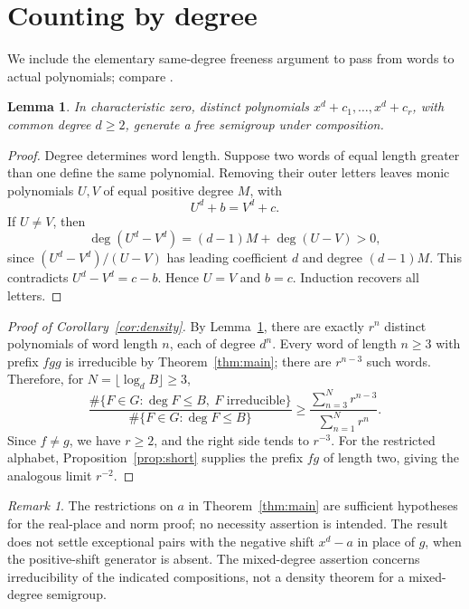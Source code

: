 \documentclass[11pt]{article}
\newtheorem{lemma}[theorem]{Lemma}
\theoremstyle{remark}
\newtheorem{remark}[theorem]{Remark}
\begin{document}
\section{Counting by degree}
We include the elementary same-degree freeness argument to pass from words to actual polynomials; compare \cite[Proposition~3.9]{BBHQS}.
\begin{lemma}\label{lem:free}
In characteristic zero, distinct polynomials $x^d+c_1,\ldots,x^d+c_r$, with common degree $d\geq2$, generate a free semigroup under composition.
\end{lemma}
\begin{proof}
Degree determines word length. Suppose two words of equal length greater than one define the same polynomial. Removing their outer letters leaves monic polynomials $U,V$ of equal positive degree $M$, with
\[
 U^d+b=V^d+c.
\]
If $U\ne V$, then
\[
 \deg(U^d-V^d)=(d-1)M+\deg(U-V)>0,
\]
since $(U^d-V^d)/(U-V)$ has leading coefficient $d$ and degree $(d-1)M$. This contradicts $U^d-V^d=c-b$. Hence $U=V$ and $b=c$. Induction recovers all letters.
\end{proof}

\begin{proof}[Proof of Corollary~\ref{cor:density}]
By Lemma~\ref{lem:free}, there are exactly $r^n$ distinct polynomials of word length $n$, each of degree $d^n$. Every word of length $n\geq3$ with prefix $fgg$ is irreducible by Theorem~\ref{thm:main}; there are $r^{n-3}$ such words. Therefore, for $N=\lfloor\log_d B\rfloor\geq3$,
\[
 \frac{\#\{F\in G:\deg F\leq B,\ F\text{ irreducible}\}}
 {\#\{F\in G:\deg F\leq B\}}
 \geq\frac{\sum_{n=3}^{N}r^{n-3}}{\sum_{n=1}^{N}r^n}.
\]
Since $f\ne g$, we have $r\geq2$, and the right side tends to $r^{-3}$. For the restricted alphabet, Proposition~\ref{prop:short} supplies the prefix $fg$ of length two, giving the analogous limit $r^{-2}$.
\end{proof}

\begin{remark}
The restrictions on $a$ in Theorem~\ref{thm:main} are sufficient hypotheses for the real-place and norm proof; no necessity assertion is intended. The result does not settle exceptional pairs with the negative shift $x^d-a$ in place of $g$, when the positive-shift generator is absent. The mixed-degree assertion concerns irreducibility of the indicated compositions, not a density theorem for a mixed-degree semigroup.
\end{remark}
\end{document}
